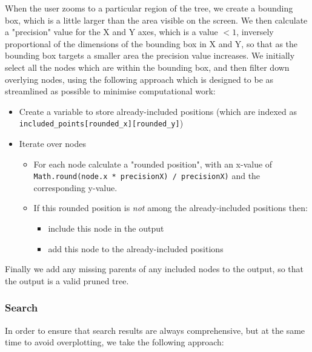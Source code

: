 When the user zooms to a particular region of the tree, we create a bounding box, which is a little larger than the area visible on the screen. We then calculate a "precision" value for the X and Y axes, which is a value $<1$, inversely proportional of the dimensions of the bounding box in X and Y, so that as the bounding box targets a smaller area the precision value increases. We initially select all the nodes which are within the bounding box, and then filter down overlying nodes, using the following approach which is designed to be as streamlined as possible to minimise computational work:

\begin{itemize}
 \item Create a variable to store already-included  positions (which are indexed as\\ \texttt{included\_points[rounded\_x][rounded\_y]})
    \item Iterate over nodes
    \begin{itemize}
    \item For each node calculate a "rounded position", with an x-value of \texttt{Math.round(node.x * precisionX) / precisionX)} and the corresponding y-value.
    \item If this rounded position is \textit{not} among the already-included positions then:
    \begin{itemize}
    \item include this node in the output
    \item add this node to the already-included positions
    
    
    \end{itemize}
    
    \end{itemize}
\end{itemize}

Finally we add any missing parents of any included nodes to the output, so that the output is a valid pruned tree.

\subsubsection*{Search}

In order to ensure that search results are always comprehensive, but at the same time to avoid overplotting, we take the following approach:

